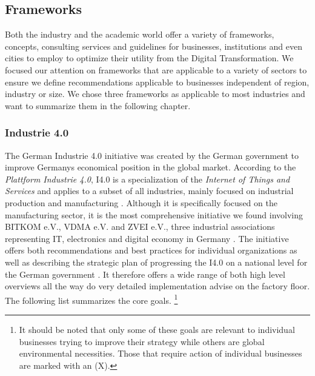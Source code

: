 \subsection{Frameworks}



Both the industry and the academic world offer a variety of frameworks, concepts, consulting services and guidelines for businesses, institutions and even cities to employ to optimize their utility from the Digital Transformation.
We focused our attention on frameworks that are applicable to a variety of sectors to ensure we define recommendations applicable to businesses independent of region, industry or size. 
We chose three frameworks as applicable to most industries and want to summarize them in the following chapter.

\subsubsection{Industrie 4.0}
The German Industrie 4.0 initiative was created by the German government to improve Germanys economical position in the global market. According to the \emph{Plattform Industrie 4.0}, I4.0 is a specialization of the \emph{Internet of Things and Services} and applies to a subset of all industries, mainly focused on industrial production and manufacturing
\cite[p.41]{umsetzungsstrategie:2015}. Although it is specifically focused on the manufacturing sector, it is the most comprehensive initiative we found involving BITKOM e.V., VDMA e.V. and ZVEI e.V., three industrial associations representing IT, electronics and digital economy in Germany \cite{zveimembers:2016, vdmamembers:2016, bitkommembers:2016}. The initiative offers both recommendations and best practices for individual organizations \cite[p.40ff.]{umsetzungsstrategie:2015} as well as describing the strategic plan of progressing the \ac{I4.0} on a national level for the German government \cite[p.15ff.]{umsetzungsstrategie:2015}. It therefore offers a wide range of both high level overviews all the way do very detailed implementation advise on the factory floor.
 The following list summarizes the core goals. \footnote{It should be noted that only some of these goals are relevant to individual businesses trying to improve their strategy while others are global environmental necessities. Those that require action of individual businesses are marked with an (X).}

